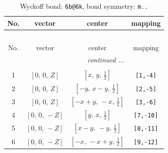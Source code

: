 \documentclass[fleqn,8pt]{jsarticle}
\begin{document}
\begin{longtable}{cccc}
\caption{Wyckoff bond: {\tt 6b@6k}, bond symmetry: {\tt m..}}
 \\
 \hline \hline
No. & vector & center & mapping \\ \hline \endfirsthead

\multicolumn{3}{l}{\tablename\ \thetable{}} \\
 \hline \hline
No. & vector & center & mapping \\ \hline \endhead

 \hline \hline
\multicolumn{3}{r}{\footnotesize\it continued ...} \\ \endfoot

 \hline \hline
\multicolumn{3}{r}{} \\ \endlastfoot

1 & $\left[ 0,\, 0,\, Z \right]$ & $\left[ x,\, y,\, \frac{1}{2} \right]$ & {\tt [1,-4]} \\ \hline
2 & $\left[ 0,\, 0,\, Z \right]$ & $\left[ - y,\, x - y,\, \frac{1}{2} \right]$ & {\tt [2,-5]} \\ \hline
3 & $\left[ 0,\, 0,\, Z \right]$ & $\left[ - x + y,\, - x,\, \frac{1}{2} \right]$ & {\tt [3,-6]} \\ \hline
4 & $\left[ 0,\, 0,\, - Z \right]$ & $\left[ y,\, x,\, \frac{1}{2} \right]$ & {\tt [7,-10]} \\ \hline
5 & $\left[ 0,\, 0,\, - Z \right]$ & $\left[ x - y,\, - y,\, \frac{1}{2} \right]$ & {\tt [8,-11]} \\ \hline
6 & $\left[ 0,\, 0,\, - Z \right]$ & $\left[ - x,\, - x + y,\, \frac{1}{2} \right]$ & {\tt [9,-12]} \\
\end{longtable}
\renewcommand{\arraystretch}{1.2}
\end{document}
